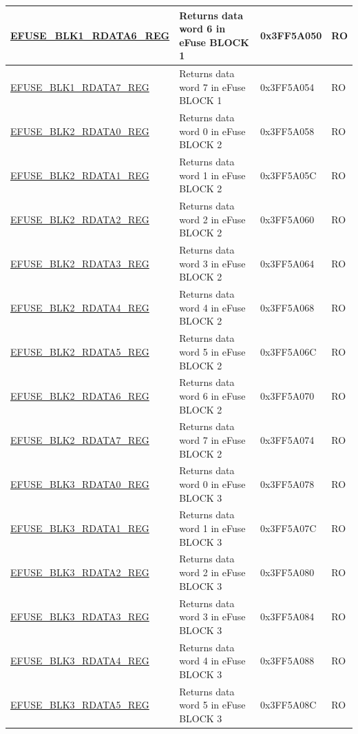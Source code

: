\begin{longtable}{ | p{5cm} | p{7.5cm} | p{2cm} | p{1cm} | }
\hyperref[regdesc:EFUSEBLK1RDATAnREG]{EFUSE\_BLK1\_RDATA6\_REG} & Returns data word 6 in eFuse BLOCK 1 & 0x3FF5A050 & RO \\ \hline
\hyperref[regdesc:EFUSEBLK1RDATAnREG]{EFUSE\_BLK1\_RDATA7\_REG} & Returns data word 7 in eFuse BLOCK 1 & 0x3FF5A054 & RO \\ \hline
\hyperref[regdesc:EFUSEBLK2RDATAnREG]{EFUSE\_BLK2\_RDATA0\_REG} & Returns data word 0 in eFuse BLOCK 2 & 0x3FF5A058 & RO \\ \hline
\hyperref[regdesc:EFUSEBLK2RDATAnREG]{EFUSE\_BLK2\_RDATA1\_REG} & Returns data word 1 in eFuse BLOCK 2 & 0x3FF5A05C & RO \\ \hline
\hyperref[regdesc:EFUSEBLK2RDATAnREG]{EFUSE\_BLK2\_RDATA2\_REG} & Returns data word 2 in eFuse BLOCK 2 & 0x3FF5A060 & RO \\ \hline
\hyperref[regdesc:EFUSEBLK2RDATAnREG]{EFUSE\_BLK2\_RDATA3\_REG} & Returns data word 3 in eFuse BLOCK 2 & 0x3FF5A064 & RO \\ \hline
\hyperref[regdesc:EFUSEBLK2RDATAnREG]{EFUSE\_BLK2\_RDATA4\_REG} & Returns data word 4 in eFuse BLOCK 2 & 0x3FF5A068 & RO \\ \hline
\hyperref[regdesc:EFUSEBLK2RDATAnREG]{EFUSE\_BLK2\_RDATA5\_REG} & Returns data word 5 in eFuse BLOCK 2 & 0x3FF5A06C & RO \\ \hline
\hyperref[regdesc:EFUSEBLK2RDATAnREG]{EFUSE\_BLK2\_RDATA6\_REG} & Returns data word 6 in eFuse BLOCK 2 & 0x3FF5A070 & RO \\ \hline
\hyperref[regdesc:EFUSEBLK2RDATAnREG]{EFUSE\_BLK2\_RDATA7\_REG} & Returns data word 7 in eFuse BLOCK 2 & 0x3FF5A074 & RO \\ \hline
\hyperref[regdesc:EFUSEBLK3RDATAnREG]{EFUSE\_BLK3\_RDATA0\_REG} & Returns data word 0 in eFuse BLOCK 3 & 0x3FF5A078 & RO \\ \hline
\hyperref[regdesc:EFUSEBLK3RDATAnREG]{EFUSE\_BLK3\_RDATA1\_REG} & Returns data word 1 in eFuse BLOCK 3 & 0x3FF5A07C & RO \\ \hline
\hyperref[regdesc:EFUSEBLK3RDATAnREG]{EFUSE\_BLK3\_RDATA2\_REG} & Returns data word 2 in eFuse BLOCK 3 & 0x3FF5A080 & RO \\ \hline
\hyperref[regdesc:EFUSEBLK3RDATAnREG]{EFUSE\_BLK3\_RDATA3\_REG} & Returns data word 3 in eFuse BLOCK 3 & 0x3FF5A084 & RO \\ \hline
\hyperref[regdesc:EFUSEBLK3RDATAnREG]{EFUSE\_BLK3\_RDATA4\_REG} & Returns data word 4 in eFuse BLOCK 3 & 0x3FF5A088 & RO \\ \hline
\hyperref[regdesc:EFUSEBLK3RDATAnREG]{EFUSE\_BLK3\_RDATA5\_REG} & Returns data word 5 in eFuse BLOCK 3 & 0x3FF5A08C & RO \\ \hline

\end{longtable}
